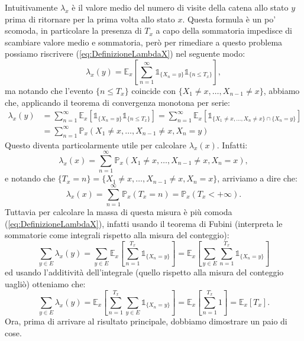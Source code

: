 \documentclass[11pt]{book}
\theoremstyle{Definizione}
\theoremstyle{TeoremaProposizioneLemmaCorollario}
\theoremstyle{OsservazioneNota}
\renewcommand{\P}{\mathbb{P}}
\newcommand{\E}{\mathbb{E}}
\newcommand{\uno}[1]{\mathds{1}_{#1}}
\begin{document}
Intuitivamente $\lambda_x$ è il valore medio del numero di visite della catena allo stato $y$ prima di ritornare per la prima volta allo stato $x$. Questa formula è un po' scomoda, in particolare la presenza di $T_x$ a capo della sommatoria impedisce di scambiare valore medio e sommatoria, però per rimediare a questo problema possiamo riscrivere (\ref{eq:DefinizioneLambdaX}) nel seguente modo:
$$
\lambda_x(y) = \E_x\left[\sum_{n = 1}^\infty \uno{\{X_n = y\}}\uno{\{n\leq T_x\}}\right],
$$
ma notando che l'evento $\{n \leq T_x\}$ coincide con $\{X_1\neq x,\dots,X_{n-1}\neq x\}$, abbiamo che, applicando il teorema di convergenza monotona per serie:
\begin{align}\label{eq:FormulaAlternativaLambdaX}
\lambda_x(y) &= \sum_{n = 1}^\infty \E_x[\uno{\{X_n = y\}}\uno{\{n \leq T_x\}}] = \sum_{n = 1}^\infty \E_x[\uno{\{X_1\neq x,\dots,X_n \neq x\}\cap \{X_n = y\}}]\nonumber\\
&= \sum_{n = 1}^\infty \P_x(X_1 \neq x,\dots,X_{n-1}\neq x, X_n = y)
\end{align}
Questo diventa particolarmente utile per calcolare $\lambda_x(x)$. Infatti:
$$
\lambda_x(x) = \sum_{n = 1}^\infty \P_x(X_1\neq x,\dots,X_{n-1}\neq x,X_n = x),
$$
e notando che  $\{T_x = n\} = \{X_1 \neq x,\dots,X_{n-1}\neq x, X_n = x\}$, arriviamo a dire che:
\begin{equation}\label{eq:FormulaLambdaX(X)}
\lambda_x(x) = \sum_{n = 1}^\infty \P_x(T_x = n) = \P_x(T_x < +\infty).
\end{equation}
Tuttavia per calcolare la massa di questa misura è più comoda (\ref{eq:DefinizioneLambdaX}), infatti usando il teorema di Fubini (interpreta le sommatorie come integrali rispetto alla misura del conteggio):
$$
\sum_{y\in E} \lambda_x(y) = \sum_{y\in E} \E_x\left[\sum_{n = 1}^{T_x} \uno{\{X_n = y\}}\right] = \E_x\left[\sum_{y\in E} \sum_{n = 1}^{T_x}\uno{\{X_n =y\}}\right]
$$
ed usando l'additività dell'integrale (quello rispetto alla misura del conteggio uagliò) otteniamo che:
\begin{equation}\label{eq:MassaLambdaX}
\sum_{y\in E} \lambda_x(y) = \E_x \left[\sum_{n = 1}^{T_x} \sum_{y\in E} \uno{\{X_n = y\}}\right] = \E_x \left[\sum_{n = 1}^{T_x} 1\right] = \E_x[T_x].
\end{equation}
Ora, prima di arrivare al risultato principale, dobbiamo dimostrare un paio di cose.
\end{document}
